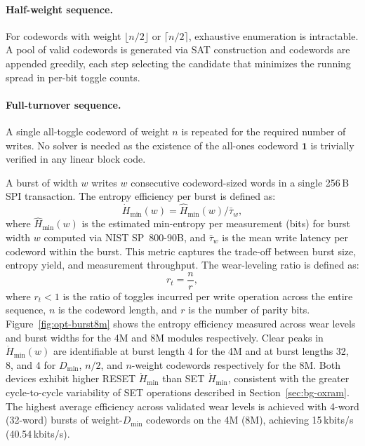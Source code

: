 \paragraph{Half-weight sequence.}
For codewords with weight $\lfloor n/2 \rfloor$ or $\lceil n/2 \rceil$,
exhaustive enumeration is intractable. A pool of valid codewords is
generated via SAT construction and codewords are appended greedily, each
step selecting the candidate that minimizes the running spread in
per-bit toggle counts.



\paragraph{Full-turnover sequence.}
A single all-toggle codeword of weight $n$ is repeated for the required
number of writes. No solver is needed as the existence of the all-ones
codeword $\mathbf{1}$ is trivially verified in any linear block code.

A burst of width $w$ writes $w$ consecutive codeword-sized words in a
single 256\,B SPI transaction. The entropy efficiency per burst is
defined as:
\begin{equation}
	\dot{H}_{\min}(w) = \hat{H}_{\min}(w) / \bar{\tau}_w,
\end{equation}
where $\hat{H}_{\min}(w)$ is the estimated min-entropy per measurement
(bits) for burst width $w$ computed via NIST SP~800-90B, and
$\bar{\tau}_w$ is the mean write latency per codeword within the burst.
This metric captures the trade-off between burst size, entropy yield,
and measurement throughput. The wear-leveling ratio is defined as:
\begin{equation}
	\label{eqn:rt}
	r_t = \frac{n}{r},
\end{equation}
where $r_t < 1$ is the ratio of toggles incurred per write operation
across the entire sequence, $n$ is the codeword length, and $r$ is the
number of parity bits. Figure~\ref{fig:opt-burst8m} shows the entropy efficiency measured across
wear levels and burst widths for the 4M and 8M modules respectively.
Clear peaks in $\dot{H}_{\min}(w)$ are identifiable at burst length 4
for the 4M and at burst lengths 32, 8, and 4 for $D_{\min}$, $n/2$, and
$n$-weight codewords respectively for the 8M. Both devices exhibit
higher RESET $\dot{H}_{\min}$ than SET $\dot{H}_{\min}$, consistent with
the greater cycle-to-cycle variability of SET operations described in
Section~\ref{sec:bg-oxram}. The highest average efficiency across
validated wear levels is achieved with 4-word (32-word) bursts of
weight-$D_{\min}$ codewords on the 4M (8M), achieving 15\,kbits/s
(40.54\,kbits/s).
